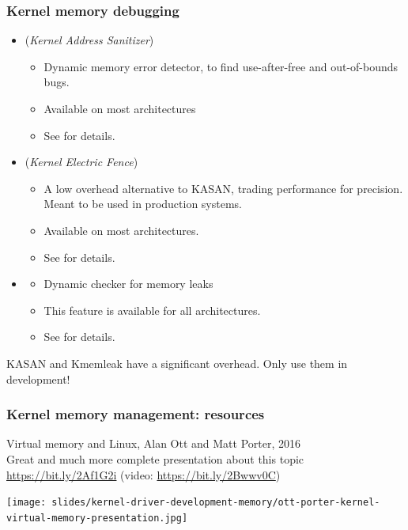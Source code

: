 \begin{frame}
  \frametitle{Kernel memory debugging}
  \begin{itemize}
  \item {} ({\em Kernel Address Sanitizer})
    \begin{itemize}
    \item Dynamic memory error detector, to find use-after-free and
      out-of-bounds bugs.
    \item Available on most architectures
    \item See  for details.
    \end{itemize}
  \item {} ({\em Kernel Electric Fence})
    \begin{itemize}
    \item A low overhead alternative to KASAN, trading performance
	  for precision. Meant to be used in production systems.
    \item Available on most architectures.
    \item See  for details.
    \end{itemize}
  \item {}
    \begin{itemize}
    \item Dynamic checker for memory leaks
    \item This feature is available for all architectures.
    \item See  for details.
    \end{itemize}
  \end{itemize}
  KASAN and Kmemleak have a significant overhead. Only use them in development!
\end{frame}

\begin{frame}
  \frametitle{Kernel memory management: resources}
  Virtual memory and Linux, Alan Ott and Matt Porter, 2016\\
  Great and much more complete presentation about this topic\\
  \url{https://bit.ly/2Af1G2i} (video: \url{https://bit.ly/2Bwwv0C})
  \begin{center}
     \texttt{[image: slides/kernel-driver-development-memory/ott-porter-kernel-virtual-memory-presentation.jpg]}
  \end{center}
\end{frame}
